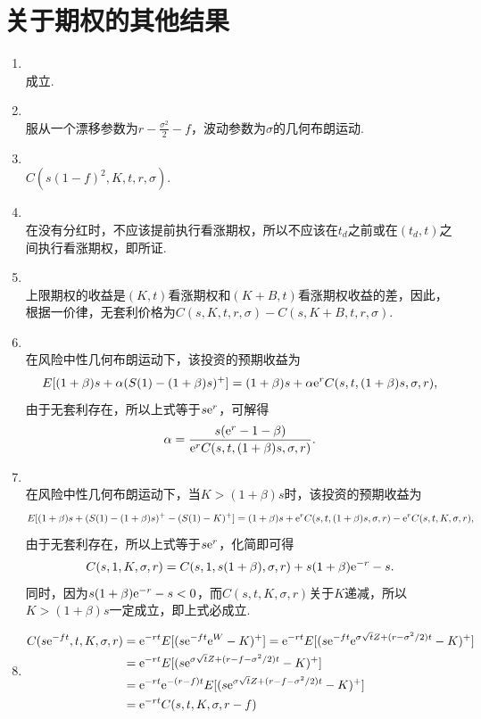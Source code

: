 \section{关于期权的其他结果}
\begin{enumerate}[label=\arabic{section}.\arabic*]
    \item \sol\\ 成立.
    \item \sol\\ 服从一个漂移参数为$\displaystyle r-\frac{\sigma^2}{2}-f$，波动参数为$\sigma$的几何布朗运动.
    \item \sol\\ $C(s(1-f)^2,K,t,r,\sigma)$.
    \item \pro\\ 在没有分红时，不应该提前执行看涨期权，所以不应该在$t_d$之前或在$(t_d, t)$之间执行看涨期权，即所证.
    \item \sol\\ 上限期权的收益是$(K,t)$看涨期权和$(K+B,t)$看涨期权收益的差，因此，根据一价律，无套利价格为$C(s,K, t, r, \sigma) - C(s,K + B, t, r, \sigma)$.
    \item \sol\\ 在风险中性几何布朗运动下，该投资的预期收益为
    \[E[(1+\beta)s+\alpha(S(1)-(1+\beta)s)^+]=(1+\beta)s+\alpha\mathrm{e}^{r}C(s,t,(1+\beta)s,\sigma,r),\]
    由于无套利存在，所以上式等于$s\mathrm{e}^r$，可解得
    \[\alpha=\frac{s(\mathrm{e}^r-1-\beta)}{\mathrm{e}^rC(s,t,(1+\beta)s,\sigma,r)}.\]
    \item \pro\\ 在风险中性几何布朗运动下，当$K>(1+\beta)s$时，该投资的预期收益为
    \[E[(1+\beta)s+(S(1)-(1+\beta)s)^+-(S(1)-K)^+] = (1+\beta)s+\mathrm{e}^rC(s, t, (1+\beta)s, \sigma, r)-\mathrm{e}^rC(s, t,K, \sigma, r),\]
    由于无套利存在，所以上式等于$s\mathrm{e}^r$，化简即可得
    \[C(s, 1,K, \sigma, r)=C(s, 1, s(1+\beta), \sigma, r)+s(1+\beta)\mathrm{e}^{-r}-s.\]
    同时，因为$s(1+\beta)\mathrm{e}^{-r}-s<0$，而$C(s, t,K, \sigma, r)$关于$K$递减，所以$K>(1+\beta)s$一定成立，即上式必成立.
    \item \pro \begin{align*}
        C(s\mathrm{e}^{-ft},t,K,\sigma,r)&=\mathrm{e}^{-rt}E[(s\mathrm{e}^{-ft}\mathrm{e}^W-K)^+]=\mathrm{e}^{-rt}E[(s\mathrm{e}^{-ft}\mathrm{e}^{\sigma\sqrt{t}Z+(r-\sigma^2/2)t}-K)^+]\\
        &=\mathrm{e}^{-rt}E[(s\mathrm{e}^{\sigma\sqrt{t}Z+(r-f-\sigma^2/2)t}-K)^+]\\
        &=\mathrm{e}^{-rt}\mathrm{e}^{-(r-f)t}E[(s\mathrm{e}^{\sigma\sqrt{t}Z+(r-f-\sigma^2/2)t}-K)^+]\\
        &=\mathrm{e}^{-rt}C(s,t,K,\sigma,r-f)
    \end{align*}

\end{enumerate}
